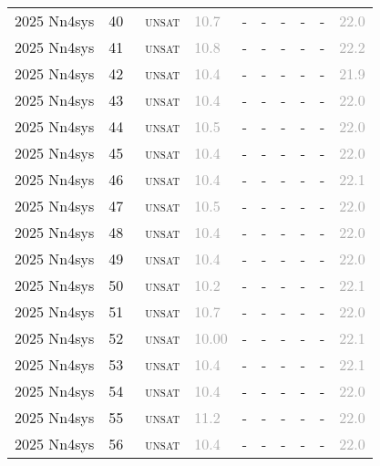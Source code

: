 \begin{center}
{\begin{longtable}{@{}llllllllll@{}}
2025 Nn4sys & 40 & ~\textsc{unsat} & \textcolor{darkgray}{10.7} & - & - & - & - & - & \textcolor{darkgray}{22.0} \\
2025 Nn4sys & 41 & ~\textsc{unsat} & \textcolor{darkgray}{10.8} & - & - & - & - & - & \textcolor{darkgray}{22.2} \\
2025 Nn4sys & 42 & ~\textsc{unsat} & \textcolor{darkgray}{10.4} & - & - & - & - & - & \textcolor{darkgray}{21.9} \\
2025 Nn4sys & 43 & ~\textsc{unsat} & \textcolor{darkgray}{10.4} & - & - & - & - & - & \textcolor{darkgray}{22.0} \\
2025 Nn4sys & 44 & ~\textsc{unsat} & \textcolor{darkgray}{10.5} & - & - & - & - & - & \textcolor{darkgray}{22.0} \\
2025 Nn4sys & 45 & ~\textsc{unsat} & \textcolor{darkgray}{10.4} & - & - & - & - & - & \textcolor{darkgray}{22.0} \\
2025 Nn4sys & 46 & ~\textsc{unsat} & \textcolor{darkgray}{10.4} & - & - & - & - & - & \textcolor{darkgray}{22.1} \\
2025 Nn4sys & 47 & ~\textsc{unsat} & \textcolor{darkgray}{10.5} & - & - & - & - & - & \textcolor{darkgray}{22.0} \\
2025 Nn4sys & 48 & ~\textsc{unsat} & \textcolor{darkgray}{10.4} & - & - & - & - & - & \textcolor{darkgray}{22.0} \\
2025 Nn4sys & 49 & ~\textsc{unsat} & \textcolor{darkgray}{10.4} & - & - & - & - & - & \textcolor{darkgray}{22.0} \\
2025 Nn4sys & 50 & ~\textsc{unsat} & \textcolor{darkgray}{10.2} & - & - & - & - & - & \textcolor{darkgray}{22.1} \\
2025 Nn4sys & 51 & ~\textsc{unsat} & \textcolor{darkgray}{10.7} & - & - & - & - & - & \textcolor{darkgray}{22.0} \\
2025 Nn4sys & 52 & ~\textsc{unsat} & \textcolor{darkgray}{10.00} & - & - & - & - & - & \textcolor{darkgray}{22.1} \\
2025 Nn4sys & 53 & ~\textsc{unsat} & \textcolor{darkgray}{10.4} & - & - & - & - & - & \textcolor{darkgray}{22.1} \\
2025 Nn4sys & 54 & ~\textsc{unsat} & \textcolor{darkgray}{10.4} & - & - & - & - & - & \textcolor{darkgray}{22.0} \\
2025 Nn4sys & 55 & ~\textsc{unsat} & \textcolor{darkgray}{11.2} & - & - & - & - & - & \textcolor{darkgray}{22.0} \\
2025 Nn4sys & 56 & ~\textsc{unsat} & \textcolor{darkgray}{10.4} & - & - & - & - & - & \textcolor{darkgray}{22.0} \\

\end{longtable}}
\end{center}
